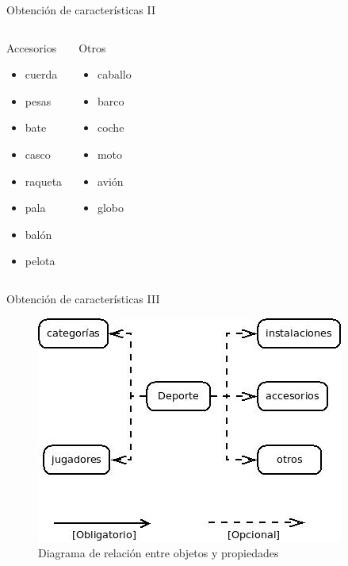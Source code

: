 \begin{frame}{Obtención de características II}
 \begin{columns}[t]
  \begin{block}{Accesorios}
   	\begin{itemize}
	\item cuerda
	\item pesas
	\item bate
	\item casco
	\item raqueta
	\item pala
	\item balón
	\item pelota
	\end{itemize}
  \end{block}
  \begin{block}{Otros}
  	\begin{itemize}
	\item caballo
	\item barco
	\item coche
	\item moto
	\item avión
	\item globo
	\end{itemize}
  \end{block}
 \end{columns}
\end{frame}


\begin{frame}{Obtención de características III}
\begin{figure} [ht]
\begin {center}
\includegraphics[scale = 0.4]{./../doc/Deportes.jpeg}
\caption{Diagrama de relación entre objetos y propiedades}
\end {center}
\end{figure}
\end{frame}
